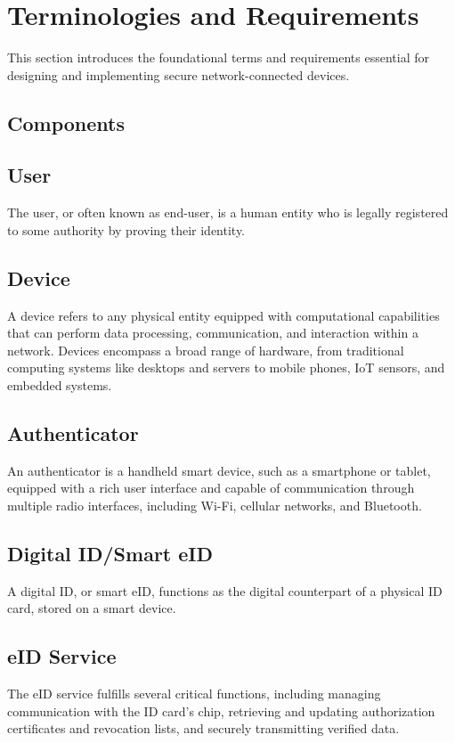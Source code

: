 \documentclass[pdflatex,sn-mathphys-num]{sn-jnl}%
\theoremstyle{thmstyleone}%
\theoremstyle{thmstyletwo}%
\theoremstyle{thmstylethree}%
\begin{document}
\section{Terminologies and Requirements}\label{term}
This section introduces the foundational terms and requirements essential for designing and implementing secure network-connected devices.

\subsection{Components}
\label{sec:2:components}

\subsection*{User}
The user, or often known as end-user, is a human entity who is legally registered to some authority by proving their identity. 

\subsection*{Device}
A device refers to any physical entity equipped with computational capabilities that can perform data processing, communication, and interaction within a network. Devices encompass a broad range of hardware, from traditional computing systems like desktops and servers to mobile phones, IoT sensors, and embedded systems.

\subsection*{Authenticator}
An authenticator is a handheld smart device, such as a smartphone or tablet, equipped with a rich user interface and capable of communication through multiple radio interfaces, including Wi-Fi, cellular networks, and Bluetooth.

\subsection*{Digital ID/Smart eID}
A digital ID, or smart eID, functions as the digital counterpart of a physical ID card, stored on a smart device.

\subsection*{eID Service}
The eID service fulfills several critical functions, including managing communication with the ID card's chip, retrieving and updating authorization certificates and revocation lists, and securely transmitting verified data.
\end{document}
